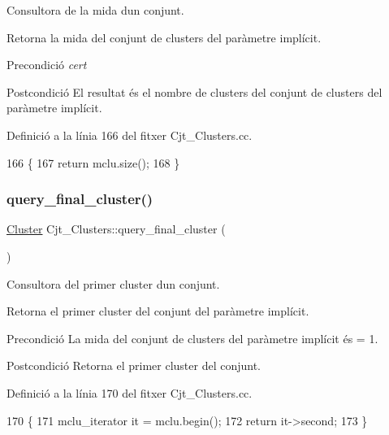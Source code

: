 Consultora de la mida d\textquotesingle{}un conjunt. 

Retorna la mida del conjunt de clusters del paràmetre implícit.

\begin{DoxyPrecond}{Precondició}
{\itshape cert} 
\end{DoxyPrecond}
\begin{DoxyPostcond}{Postcondició}
El resultat és el nombre de clusters del conjunt de clusters del paràmetre implícit. 
\end{DoxyPostcond}


Definició a la línia 166 del fitxer Cjt\+\_\+\+Clusters.\+cc.


\begin{DoxyCode}
166                                          \{
167     \textcolor{keywordflow}{return} mclu.size();
168 \}
\end{DoxyCode}
\mbox{\label{class_cjt___clusters_a48cb7ca0417ba1de9593a00f98d91880}} 
\subsubsection{\texorpdfstring{query\+\_\+final\+\_\+cluster()}{query\_final\_cluster()}}
{\footnotesize\ttfamily \hyperlink{class_cluster}{Cluster} Cjt\+\_\+\+Clusters\+::query\+\_\+final\+\_\+cluster (\begin{DoxyParamCaption}{ }\end{DoxyParamCaption})}



Consultora del primer cluster d\textquotesingle{}un conjunt. 

Retorna el primer cluster del conjunt del paràmetre implícit.

\begin{DoxyPrecond}{Precondició}
La mida del conjunt de clusters del paràmetre implícit és = 1. 
\end{DoxyPrecond}
\begin{DoxyPostcond}{Postcondició}
Retorna el primer cluster del conjunt. 
\end{DoxyPostcond}


Definició a la línia 170 del fitxer Cjt\+\_\+\+Clusters.\+cc.


\begin{DoxyCode}
170                                           \{
171     mclu\_iterator it = mclu.begin();
172     \textcolor{keywordflow}{return} it->second;
173 \}
\end{DoxyCode}
\mbox{\label{class_cjt___clusters_a4ab91d8e8222f35b4c9592c5ab2b4bf3}} 
